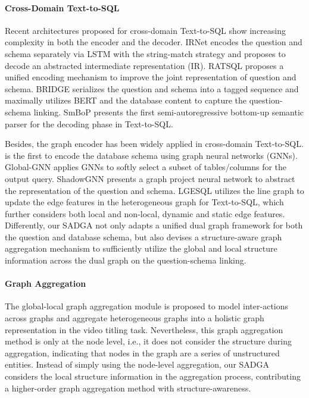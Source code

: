 \documentclass{article}
\begin{document}
\paragraph{Cross-Domain Text-to-SQL}
Recent architectures proposed for cross-domain Text-to-SQL show increasing complexity in both the encoder and the decoder.
IRNet \citep{guo2019towards} encodes the question and schema separately via LSTM with the string-match strategy and proposes to decode an abstracted intermediate representation (IR). RATSQL \citep{wang2020rat} proposes a unified encoding mechanism to improve the joint representation of question and schema. BRIDGE \citep{lin2020bridging} serializes the question and schema into a tagged sequence and maximally utilizes BERT \citep{devlin2018bert} and the database content to capture the question-schema linking. SmBoP \citep{rubin2021smbop} presents the first semi-autoregressive bottom-up semantic parser for the decoding phase in Text-to-SQL.

Besides, the graph encoder has been widely applied in cross-domain Text-to-SQL. \citet{bogin2019representing} is the first to encode the database schema using graph neural networks (GNNs). Global-GNN \citep{bogin2019global} applies GNNs to softly select a subset of tables/columns for the output query. ShadowGNN \citep{chen2021shadowgnn} presents a graph project neural network to abstract the representation of the question and schema. LGESQL \citep{cao-etal-2021-lgesql} utilizes the line graph to update the edge features in the heterogeneous graph for Text-to-SQL, which further considers both local and non-local, dynamic and static edge features. Differently, our SADGA not only adapts a unified dual graph framework for both the question and database schema, but also devises a structure-aware graph aggregation mechanism to sufficiently utilize the global and local structure information across the dual graph on the question-schema linking. 

\paragraph{Graph Aggregation}
The global-local graph aggregation module \citep{zhang2020comprehensive} is proposed to model inter-actions across graphs and aggregate heterogeneous graphs into a holistic graph representation in the video titling task. Nevertheless, this graph aggregation method is only at the node level, i.e., it does not consider the structure during aggregation, indicating that nodes in the graph are a series of unstructured entities. Instead of simply using the node-level aggregation, our SADGA considers the local structure information in the aggregation process, contributing a higher-order graph aggregation method with structure-awareness.
\end{document}
